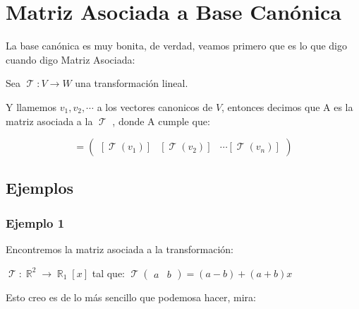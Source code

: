 \documentclass[12pt]{report}                                    %
\DeclareMathOperator \Real {\mathbb{R}}                         %
\DeclareMathOperator \LinealTransformation {\mathcal{T}}        %
\DeclareMathOperator \LT {\mathcal{T}}                          %
\newcommand{\pVector}[1]{                                       %
        \ensuremath{\begin{pmatrix}#1\end{pmatrix}}                 %
    }
\begin{document}
    \clearpage
    \section{Matriz Asociada a Base Canónica}
        La base canónica es muy bonita, de verdad, veamos primero que es lo que digo cuando digo
        Matriz Asociada:

        Sea $\LinealTransformation : V \to W $ una transformación lineal.

        Y llamemos $v_1, v_2, \cdots$ a los vectores canonicos de $V$, entonces decimos que A
        es la matriz asociada a la $\LinealTransformation$ , donde A cumple que:

        \begin{equation*}
            [\LT]  = \pVector{ [\LT(v_1)] & [\LT(v_2)] & \cdots [\LT(v_n)]}
        \end{equation*}


        \clearpage
        \subsection{Ejemplos}


            \subsubsection{\large Ejemplo 1}
                Encontremos la matriz asociada a la transformación:

                $\LinealTransformation : \Real^2 \to \Real_1[x]$ tal que: 
                $\LinealTransformation \pVector{a&b} = (a-b) + (a+b)x$

                Esto creo es de lo más sencillo que podemosa hacer, mira:
\end{document}
